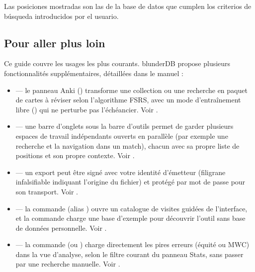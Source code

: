 \documentclass[letterpaper,10pt,spanish]{sphinxmanual}
\begin{document}
\sphinxAtStartPar
Las posiciones mostradas son las de la base de datos que cumplen los criterios de búsqueda introducidos por el usuario.


\subsection{Pour aller plus loin}
\label{\detokenize{guide_utilisateur:pour-aller-plus-loin}}
\sphinxAtStartPar
Ce guide couvre les usages les plus courants. blunderDB propose plusieurs
fonctionnalités supplémentaires, détaillées dans le manuel :
\begin{itemize}
\item {} 
\sphinxAtStartPar
{} — le panneau Anki () transforme une
collection ou une recherche en paquet de cartes à réviser selon
l’algorithme FSRS, avec un mode d’entraînement libre () qui ne
perturbe pas l’échéancier. Voir {\hyperref[\detokenize{manuel:panneau-anki}]{}}.

\item {} 
\sphinxAtStartPar
{} — une barre d’onglets sous la barre d’outils permet de
garder plusieurs espaces de travail indépendants ouverts en parallèle (par
exemple une recherche et la navigation dans un match), chacun avec sa
propre liste de positions et son propre contexte. Voir {\hyperref[\detokenize{manuel:onglets-vues}]{}}.

\item {} 
\sphinxAtStartPar
{} — un export peut être signé avec votre identité
d’émetteur (filigrane infalsifiable indiquant l’origine du fichier) et
protégé par mot de passe pour son transport. Voir {\hyperref[\detokenize{manuel:diffusion-controlee}]{}}.

\item {} 
\sphinxAtStartPar
{} — la commande 
(alias ) ouvre un catalogue de visites guidées de l’interface,
et la commande  charge une base d’exemple pour découvrir l’outil
sans base de données personnelle. Voir {\hyperref[\detokenize{manuel:visites-guidees}]{}}.

\item {} 
\sphinxAtStartPar
{} — la commande  (ou )
charge directement les pires erreurs (équité ou MWC) dans la vue
d’analyse, selon le filtre courant du panneau Stats, sans passer par une
recherche manuelle. Voir {\hyperref[\detokenize{manuel:stats}]{}}.

\end{itemize}
\end{document}
